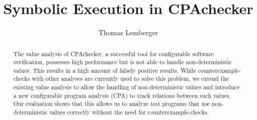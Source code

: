 \documentclass{acm_proc_article-sp}
\begin{document}
\sloppy
\title{Symbolic Execution in CPAchecker}
\subtitle{}
\author{
  \alignauthor
  Thomas Lemberger
}
\maketitle

\begin{abstract}
  The value analysis of CPAchecker, a successful tool for configurable software verification, possesses high performance but is not able to handle non-deterministic values.
This results in a high amount of falsely positive results.
While counterexample-checks with other analyses are currently used to solve this problem,
we extend the existing value analysis to allow the handling of non-deterministic values and introduce a new configurable program analysis (CPA) to track relations between such values.
Our evaluation shows that this allows us to analyze test programs that use non-deterministic values correctly without the need for counterexample-checks.
\end{abstract}







\end{document}
